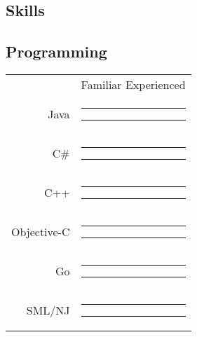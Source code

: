 \documentclass[11pt]{article}
\newcommand{\smpad}{\hspace*{.2em}}
\begin{document}
\begin{multicols}{2}
{{\begin{minipage}[t][\paperheight]{.38\textwidth}
\begin{minipage}[t][\paperheight]{.95\textwidth}
\section{\faCogs{} Skills}
\vspace{-1ex}
\subsection{\large\dotfill Programming\dotfill}
\vspace{-1ex}\hspace{3em}\normalsize
\begin{tabularx}{\textwidth}{@{}r@{}c@{}}
	\hfill & \footnotesize Familiar \hspace*{1.7em} Experienced\\
	Java \smpad&%
		\color{skillLvl}\rule[.25ex]{8em}{1ex}%
		\color{skillBkgd}\rule[.25ex]{2em}{1ex}\\
	C\# \smpad&%
		\color{skillLvl}\rule[.25ex]{7em}{1ex}%
		\color{skillBkgd}\rule[.25ex]{3em}{1ex}\\
	C++ \smpad&%
		\color{skillLvl}\rule[.25ex]{6em}{1ex}%
		\color{skillBkgd}\rule[.25ex]{4em}{1ex}\\
	Objective-C \smpad&%
		\color{skillLvl}\rule[.25ex]{5em}{1ex}%
		\color{skillBkgd}\rule[.25ex]{5em}{1ex}\\
	Go \smpad&%
		\color{skillLvl}\rule[.25ex]{4em}{1ex}%
		\color{skillBkgd}\rule[.25ex]{6em}{1ex}\\
	SML/NJ \smpad&%
		\color{skillLvl}\rule[.25ex]{3em}{1ex}%
		\color{skillBkgd}\rule[.25ex]{7em}{1ex}\\
\end{tabularx}

\end{minipage}
\end{minipage}}}
\end{multicols}
\end{document}
